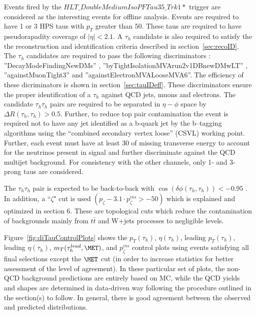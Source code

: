 Events fired by the $HLT\_DoubleMediumIsoPFTau35\_Trk1*$ trigger are considered as the interesting events for offline analysis. Events are required to have 1 or 3 HPS taus with $p_{T}$ greater than 50\gev . These taus are required to have pseudorapadity coverage of $|\eta| < 2.1$. A $\tau_{h}$ candidate is also 
required to satisfy the the reconstruction and identification criteria described in section~\ref{sec:recoID}. The $\tau_{h}$ candidates are required to pass the 
following discriminators : ''DecayModeFindingNewDMs'' , ''byTightIsolationMVArun2v1DBnewDMwLT'' , ''againstMuonTight3''  and ''againstElectronMVALooseMVA6''.  The efficiency of 
these dicriminators is shown in section~\ref{sec:tauIDeff}. These discriminators ensure the proper identification of a $\tau_{h}$ against QCD jets, muons and electrons. The candidate $\tau_{h}\tau_{h}$ pairs are required to be separated in $\eta-\phi$ space by $\Delta R(\tau_{h},\tau_{h}) > 0.5 $. Further, to reduce top pair contamination the event is required not to have any jet identified as a b-quark jet by the b–tagging algorithms using the “combined secondary vertex loose” (CSVL) working point. Further, each event must have at least 30 \gev of missing transverse energy to account for the neutrinos present in signal and further discriminate against the QCD multijet background. For consistency with the other channels, only 1- and 3-prong taus are considered. 

The $\tau_{h}\tau_{h}$ pair is expected to be back-to-back with $\cos(\delta\phi(\tau_{h},\tau_{h})) < -0.95$ . In addition, a ``$\zeta$" cut is used 
$(p_{\zeta}- 3.1\cdot p_{\zeta}^{vis} > -50)$ which is explained and optimized in section 6. These are topological cuts which reduce the contamination of backgrounds mainly from  $t\bar{t}$ and W+jets processes to negligible levels.  

Figure~\ref{fig:diTauControlPlots} shows the $p_{T}(\tau_{h})$, $\eta(\tau_{h})$, leading $p_{T}(\tau_{h})$, leading $\eta(\tau_{h})$, 
$m_{T}(\tau_{h}^{lead},\MET)$, and $p_{\zeta}^{vis}$ control plots using events satisfying all final selections except the $\MET$ cut (in order to increase 
statistics for better assessment of the level of agreement). 
In these particular set of plots, the non-QCD background predictions are entirely based on MC, while the QCD yields and shapes are determined in data-driven way 
following the procedure outlined in the section(s) to follow. In general, there is good agreement between the observed and predicted 
distributions.

